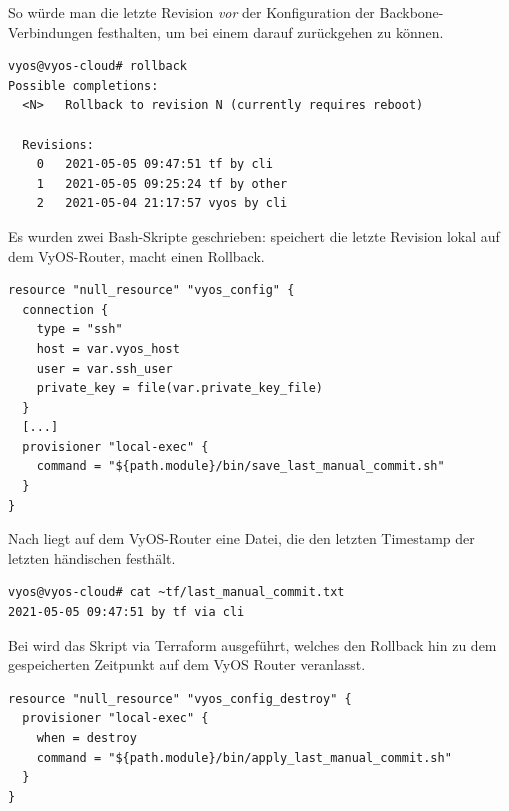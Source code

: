 So würde man die letzte Revision \textit{vor} der Konfiguration der Backbone-Verbindungen festhalten, um bei einem  darauf zurückgehen zu können.

\begin{lstlisting}[label=rollback-cmd-vyos,caption=Rollback auf Revision N nach Reboot]
vyos@vyos-cloud# rollback
Possible completions:
  <N>   Rollback to revision N (currently requires reboot)

  Revisions:
    0   2021-05-05 09:47:51 tf by cli
    1   2021-05-05 09:25:24 tf by other
    2   2021-05-04 21:17:57 vyos by cli
\end{lstlisting}

Es wurden zwei Bash-Skripte geschrieben:  speichert die letzte Revision lokal auf dem VyOS-Router,  macht einen Rollback.

\begin{lstlisting}[label=save-last-commit-vyos,caption=Bla]
resource "null_resource" "vyos_config" {
  connection {
    type = "ssh"
    host = var.vyos_host
    user = var.ssh_user
    private_key = file(var.private_key_file)
  }
  [...]
  provisioner "local-exec" {
    command = "${path.module}/bin/save_last_manual_commit.sh"
  }
}
\end{lstlisting}

Nach  liegt auf dem VyOS-Router eine Datei, die den letzten Timestamp der letzten \glqq händischen\grqq{} festhält.

\begin{lstlisting}[label=save-last-commit-file-vyos,caption=Blub]
vyos@vyos-cloud# cat ~tf/last_manual_commit.txt
2021-05-05 09:47:51 by tf via cli
\end{lstlisting}

Bei  wird das Skript  via Terraform  ausgeführt, welches den Rollback hin zu dem gespeicherten Zeitpunkt auf dem VyOS Router veranlasst.

\begin{lstlisting}[label=apply-last-commit-vyos,caption=Blub]
resource "null_resource" "vyos_config_destroy" {
  provisioner "local-exec" {
    when = destroy
    command = "${path.module}/bin/apply_last_manual_commit.sh"
  }
}
\end{lstlisting}


